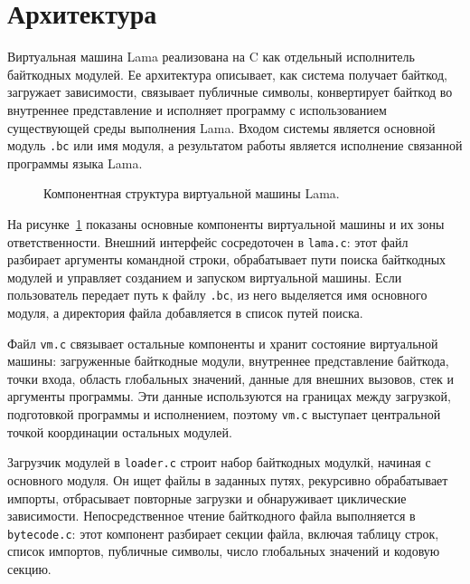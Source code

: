 
\section{Архитектура}
\label{sec:architecture}

Виртуальная машина Lama реализована на C как отдельный исполнитель байткодных
модулей. Ее архитектура описывает, как система получает байткод, загружает
зависимости, связывает публичные символы, конвертирует байткод во внутреннее
представление и исполняет программу с использованием существующей среды
выполнения Lama. Входом системы является основной модуль \verb=.bc= или имя модуля, а результатом работы является исполнение связанной программы языка Lama.

\begin{figure}[H]
    \centering
    \resizebox{\textwidth}{!}{}
    \caption{Компонентная структура виртуальной машины Lama.}
    \label{fig:vm-components}
\end{figure}

На рисунке~\ref{fig:vm-components} показаны основные компоненты виртуальной
машины и их зоны ответственности. Внешний интерфейс сосредоточен в
\verb=lama.c=: этот файл разбирает аргументы командной строки, обрабатывает
пути поиска байткодных модулей и управляет созданием и запуском виртуальной
машины. Если пользователь передает путь к файлу \verb=.bc=, из него выделяется
имя основного модуля, а директория файла добавляется в список путей поиска.

Файл \verb=vm.c= связывает остальные компоненты и хранит состояние
виртуальной машины: загруженные байткодные модули, внутреннее представление байткода,
точки входа, область глобальных значений, данные для внешних вызовов, стек и
аргументы программы. Эти данные используются на границах между загрузкой,
подготовкой программы и исполнением, поэтому \verb=vm.c= выступает центральной
точкой координации остальных модулей.

Загрузчик модулей в \verb=loader.c= строит набор байткодных модулкй, начиная с
основного модуля. Он ищет файлы в заданных путях, рекурсивно обрабатывает
импорты, отбрасывает повторные загрузки и обнаруживает циклические зависимости.
Непосредственное чтение байткодного файла выполняется в \verb=bytecode.c=:
этот компонент разбирает секции файла, включая таблицу строк, список импортов,
публичные символы, число глобальных значений и кодовую секцию.

